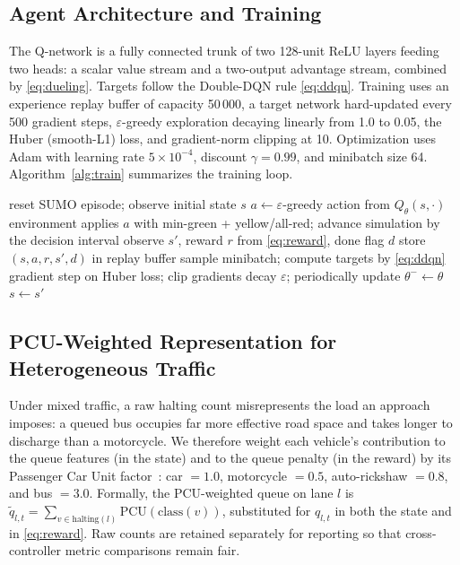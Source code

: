 \documentclass[conference]{IEEEtran}
\begin{document}
\subsection{Agent Architecture and Training}
The Q-network is a fully connected trunk of two 128-unit ReLU layers feeding two
heads: a scalar value stream and a two-output advantage stream, combined by
\eqref{eq:dueling}. Targets follow the Double-DQN rule \eqref{eq:ddqn}. Training
uses an experience replay buffer of capacity 50\,000, a target network
hard-updated every 500 gradient steps, $\varepsilon$-greedy exploration decaying
linearly from 1.0 to 0.05, the Huber (smooth-L1) loss, and gradient-norm
clipping at 10. Optimization uses Adam with learning rate $5\times10^{-4}$,
discount $\gamma=0.99$, and minibatch size 64. Algorithm~\ref{alg:train}
summarizes the training loop.

\begin{algorithm}[t]
\caption{D3QN training loop (per episode)}
\label{alg:train}
\begin{algorithmic}[1]
\State reset SUMO episode; observe initial state $s$
  \State $a \gets \varepsilon$-greedy action from $Q_\theta(s,\cdot)$
  \State environment applies $a$ with min-green + yellow/all-red;
  \State \quad advance simulation by the decision interval
  \State observe $s'$, reward $r$ from \eqref{eq:reward}, done flag $d$
  \State store $(s,a,r,s',d)$ in replay buffer
     \State sample minibatch; compute targets by \eqref{eq:ddqn}
     \State gradient step on Huber loss; clip gradients
     \State decay $\varepsilon$; periodically update $\theta^- \gets \theta$
  \EndIf
  \State $s \gets s'$
\EndWhile
\end{algorithmic}
\end{algorithm}

\subsection{PCU-Weighted Representation for Heterogeneous Traffic}
Under mixed traffic, a raw halting count misrepresents the load an approach
imposes: a queued bus occupies far more effective road space and takes longer to
discharge than a motorcycle. We therefore weight each vehicle's contribution to
the queue features (in the state) and to the queue penalty (in the reward) by its
Passenger Car Unit factor~\cite{irc106}: car $=1.0$, motorcycle $=0.5$,
auto-rickshaw $=0.8$, and bus $=3.0$. Formally, the PCU-weighted queue on lane
$l$ is $\tilde q_{l,t} = \sum_{v \in \text{halting}(l)} \mathrm{PCU}(\text{class}(v))$,
substituted for $q_{l,t}$ in both the state and in \eqref{eq:reward}. Raw counts
are retained separately for reporting so that cross-controller metric comparisons
remain fair.
\end{document}
